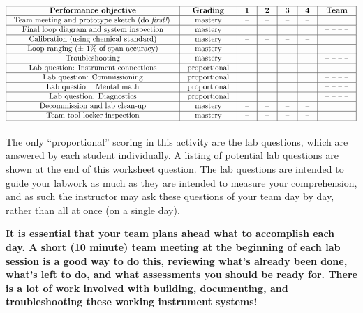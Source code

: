 

$$\vbox{\offinterlineskip
\halign{\strut
\vrule \quad\hfil # \ \hfil & 
\vrule \quad\hfil # \ \hfil & 
\vrule \quad\hfil # \ \hfil & 
\vrule \quad\hfil # \ \hfil & 
\vrule \quad\hfil # \ \hfil & 
\vrule \quad\hfil # \ \hfil & 
\vrule \quad\hfil # \ \hfil \vrule \cr
\noalign{\hrule}
%
{\bf Performance objective} & {\bf Grading} & {\bf 1} & {\bf 2} & {\bf 3} & {\bf 4} & {\bf Team} \cr
%
\noalign{\hrule}
%
Team meeting and prototype sketch (do {\it first!}) & mastery & -- & -- & -- & -- & \cr
%
\noalign{\hrule}
%
Final loop diagram and system inspection & mastery & & & & & -- -- -- -- \cr
%
\noalign{\hrule}
%
Calibration (using chemical standard) & mastery & -- & -- & -- & -- &  \cr
%
\noalign{\hrule}
%
Loop ranging ($\pm$ 1\% of span accuracy) & mastery & & & & & -- -- -- -- \cr
%
\noalign{\hrule}
%
Troubleshooting & mastery & & & & & -- -- -- -- \cr
%
\noalign{\hrule}
%
Lab question: Instrument connections & proportional &  &  &  &  & -- -- -- -- \cr
%
\noalign{\hrule}
%
Lab question: Commissioning & proportional &  &  &  &  & -- -- -- -- \cr
%
\noalign{\hrule}
%
Lab question: Mental math & proportional &  &  &  &  & -- -- -- -- \cr
%
\noalign{\hrule}
%
Lab question: Diagnostics & proportional &  &  &  &  & -- -- -- -- \cr
%
\noalign{\hrule}
%
Decommission and lab clean-up & mastery & -- & -- & -- & -- &  \cr
%
\noalign{\hrule}
%
Team tool locker inspection & mastery & -- & -- & -- & -- &  \cr
%
\noalign{\hrule}
} %
}$$ %

The only ``proportional'' scoring in this activity are the lab questions, which are answered by each student individually.  A listing of potential lab questions are shown at the end of this worksheet question.  The lab questions are intended to guide your labwork as much as they are intended to measure your comprehension, and as such the instructor may ask these questions of your team day by day, rather than all at once (on a single day).

\vskip 10pt

{\bf It is essential that your team plans ahead what to accomplish each day.  A short (10 minute) team meeting at the beginning of each lab session is a good way to do this, reviewing what's already been done, what's left to do, and what assessments you should be ready for.  There is a lot of work involved with building, documenting, and troubleshooting these working instrument systems!}

